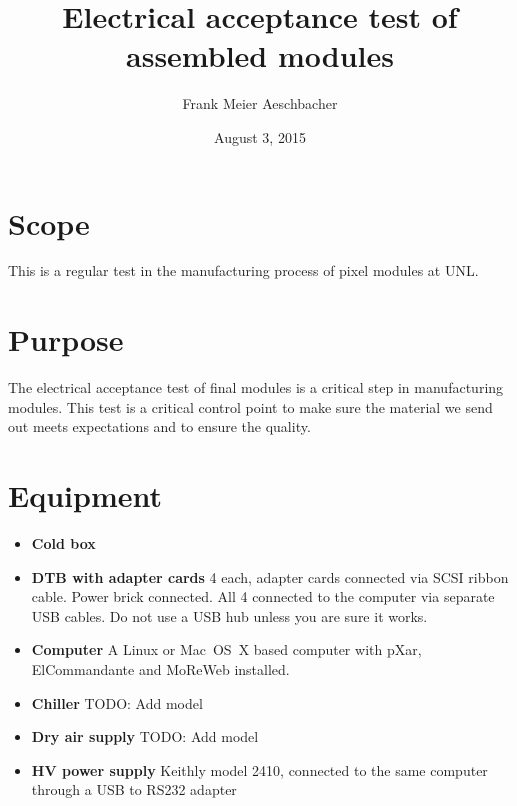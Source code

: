 \documentclass[12pt]{unlsilabsop}
\title{Electrical acceptance test of assembled modules}
\date{August 3, 2015}
\author{Frank Meier Aeschbacher}
\begin{document}
\maketitle

\section{Scope}
This is a regular test in the manufacturing process of pixel modules at UNL.

\section{Purpose}
The electrical acceptance test of final modules is a critical step in manufacturing modules. This test is a critical control point to make sure the material we send out meets expectations and to ensure the quality.



\section{Equipment}

\begin{itemize}
\item \textbf{Cold box} 
\item \textbf{DTB with adapter cards} 4 each, adapter cards connected via SCSI ribbon cable. Power brick connected. All 4 connected to the computer via separate USB cables. Do not use a USB hub unless you are sure it works.
\item \textbf{Computer} A Linux or Mac~OS~X based computer with pXar, ElCommandante and MoReWeb installed.
\item \textbf{Chiller} TODO: Add model
\item \textbf{Dry air supply} TODO: Add model
\item \textbf{HV power supply} Keithly model 2410, connected to the same computer through a USB to RS232 adapter
\end{itemize}
\end{document}
